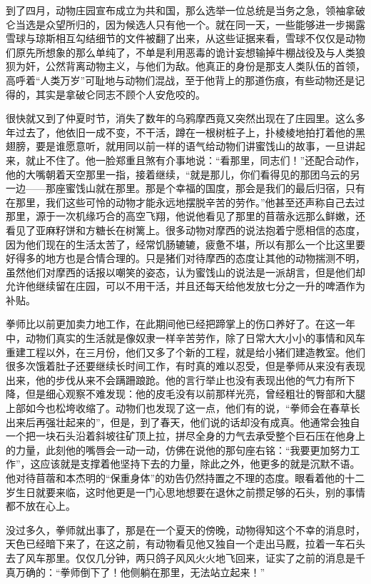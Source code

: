 到了四月，动物庄园宣布成立为共和国，那么选举一位总统是当务之急，领袖拿破仑当选是众望所归的，因为候选人只有他一个。就在同一天，一些能够进一步揭露雪球与琼斯相互勾结细节的文件被翻了出来，从这些证据来看，雪球不仅仅是动物们原先所想象的那么单纯了，不单是利用恶毒的诡计妄想输掉牛棚战役及与人类狼狈为奸，公然背离动物主义，与他们为敌。他真正的身份是那支人类队伍的首领，高呼着“人类万岁”可耻地与动物们混战，至于他背上的那道伤痕，有些动物还是记得的，其实是拿破仑同志不顾个人安危咬的。

很快就又到了仲夏时节，消失了数年的乌鸦摩西竟又突然出现在了庄园里。这么多年过去了，他依旧一成不变，不干活，蹲在一根树桩子上，扑棱棱地拍打着他的黑翅膀，要是谁愿意听，就用同以前一样的语气给动物们讲蜜饯山的故事，一旦讲起来，就止不住了。他一脸郑重且煞有介事地说：“看那里，同志们！”还配合动作，他的大嘴朝着天空那里一指，接着继续，“就是那儿，你们看得见的那团乌云的另一边——那座蜜饯山就在那里。那是个幸福的国度，那会是我们的最后归宿，只有在那里，我们这些可怜的动物才能永远地摆脱辛苦的劳作。”他甚至还声称自己去过那里，源于一次机缘巧合的高空飞翔，他说他看见了那里的苜蓿永远那么鲜嫩，还看见了亚麻籽饼和方糖长在树篱上。很多动物对摩西的说法抱着宁愿相信的态度，因为他们现在的生活太苦了，经常饥肠辘辘，疲惫不堪，所以有那么一个比这里要好得多的地方也是合情合理的。只是猪们对待摩西的态度让其他的动物揣测不明，虽然他们对摩西的话报以嘲笑的姿态，认为蜜饯山的说法是一派胡言，但是他们却允许他继续留在庄园，可以不用干活，并且还每天给他发放七分之一升的啤酒作为补贴。

拳师比以前更加卖力地工作，在此期间他已经把蹄掌上的伤口养好了。在这一年中，动物们真实的生活就是像奴隶一样辛苦劳作，除了日常大大小小的事情和风车重建工程以外，在三月份，他们又多了个新的工程，就是给小猪们建造教室。他们很多次饿着肚子还要继续长时间工作，有时真的难以忍受，但是拳师从来没有表现出来，他的步伐从来不会蹒跚踉跄。他的言行举止也没有表现出他的气力有所下降，但是细心观察不难发现：他的皮毛没有以前那样光亮，曾经粗壮的臀部和大腿上部如今也松垮收缩了。动物们也发现了这一点，他们有的说，“拳师会在春草长出来后再强壮起来的”，但是，到了春天，他们说的话却没有成真。他通常会独自一个把一块石头沿着斜坡往矿顶上拉，拼尽全身的力气去承受整个巨石压在他身上的力量，此刻他的嘴唇会一动一动，仿佛在说他的那句座右铭：“我要更加努力工作”，这应该就是支撑着他坚持下去的力量，除此之外，他更多的就是沉默不语。他对待苜蓿和本杰明的“保重身体”的劝告仍然持置之不理的态度。眼看着他的十二岁生日就要来临，这时他更是一门心思地想要在退休之前攒足够的石头，别的事情都不放在心上。

没过多久，拳师就出事了，那是在一个夏天的傍晚，动物得知这个不幸的消息时，天色已经暗下来了，在这之前，有动物看见他又独自一个走出马厩，拉着一车石头去了风车那里。仅仅几分钟，两只鸽子风风火火地飞回来，证实了之前的消息是千真万确的：“拳师倒下了！他侧躺在那里，无法站立起来！”

